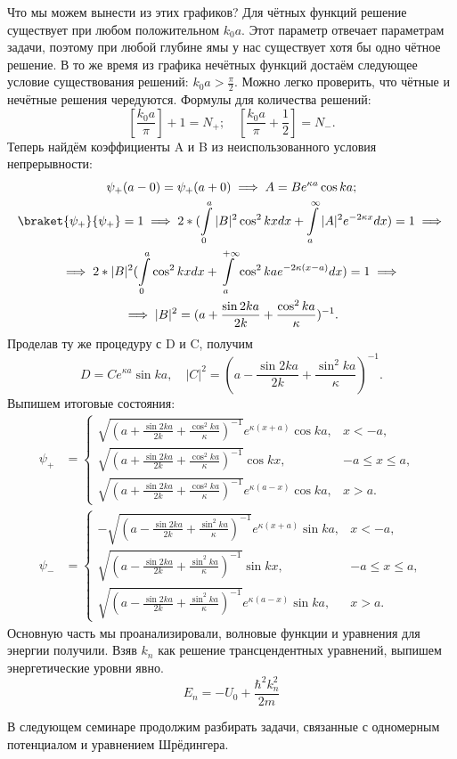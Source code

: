 Что мы можем вынести из этих графиков? Для чётных функций решение существует
при любом положительном $k_0a$. Этот параметр отвечает параметрам задачи,
поэтому при любой глубине ямы у нас существует хотя бы одно чётное решение. В
то же время из графика нечётных функций достаём следующее условие существования
решений: $k_0a>\frac{\pi}{2}$. Можно легко проверить, что чётные и нечётные
решения чередуются. Формулы для количества решений:
\[
  \left[\frac{k_0a}{\pi}\right] + 1 = N_+; \quad \left[\frac{k_0a}{\pi} + \frac{1}{2}\right] = N_-.
\]
Теперь найдём коэффициенты A и B из неиспользованного условия непрерывности:
\begin{gather*}
  \psi_+(a-0) = \psi_+(a+0) \implies A = Be^{\kappa a}\cos ka; \\
  \braket{\psi_+}{\psi_+} = 1 \implies 2 * (\int\limits_0^a |B|^2\cos^2 kx dx + \int\limits_a^\infty |A|^2e^{-2\kappa x} dx) = 1 \implies \\
  \implies 2 *|B|^2 (\int\limits_0^a \cos^2 kx dx + \int\limits_a^{+\infty }\cos^2 kae^{-2\kappa(x-a)} dx) = 1 \implies \\
  \implies |B|^2 = (a + \frac{\sin 2ka}{2k} + \frac{\cos^2 ka}{\kappa})^{-1}.
\end{gather*}
Проделав ту же процедуру с D и C, получим
\[
  D = Ce^{\kappa a}\sin ka, \quad |C|^2 = (a - \frac{\sin 2ka}{2k} + \frac{\sin^2 ka}{\kappa})^{-1}.
\]
Выпишем итоговые состояния:
\begin{align*}
  \psi_+ &=
  \begin{cases}
    \sqrt{(a + \frac{\sin 2ka}{2k} + \frac{\cos^2 ka}{\kappa})^{-1}}e^{\kappa (x + a)}\cos{ka}, & x < -a,\\
    \sqrt{(a + \frac{\sin 2ka}{2k} + \frac{\cos^2 ka}{\kappa})^{-1}} \cos kx, & -a \leq x \leq a,\\
    \sqrt{(a + \frac{\sin 2ka}{2k} + \frac{\cos^2 ka}{\kappa})^{-1}}e^{\kappa (a - x)}\cos{ka},& x > a.
  \end{cases}\\
  \psi_- &=
  \begin{cases}
    -\sqrt{(a - \frac{\sin 2ka}{2k} + \frac{\sin^2 ka}{\kappa})^{-1}}e^{\kappa (x+a)}\sin ka, & x < -a,\\
    \sqrt{(a - \frac{\sin 2ka}{2k} + \frac{\sin^2 ka}{\kappa})^{-1}} \sin kx, & -a \leq x \leq a,\\
    \sqrt{(a - \frac{\sin 2ka}{2k} + \frac{\sin^2 ka}{\kappa})^{-1}}e^{\kappa (a-x)}\sin ka, & x > a.
  \end{cases}
\end{align*}
Основную часть мы проанализировали, волновые функции и уравнения для энергии
получили. Взяв $k_n$ как решение трансцендентных уравнений, выпишем
энергетические уровни явно.
\[
  E_n = -U_0 + \frac{\hbar^2 k_n^2}{2m}
\]
\qedsq

В следующем семинаре продолжим разбирать задачи, связанные с одномерным
потенциалом и уравнением Шрёдингера.
